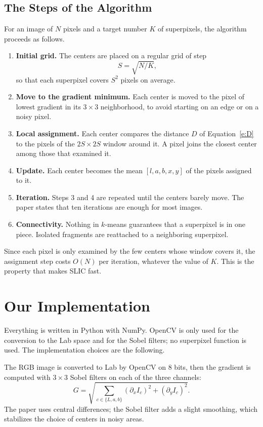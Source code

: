 \subsection{The Steps of the Algorithm}
For an image of $N$ pixels and a target number $K$ of
superpixels, the algorithm proceeds as follows.
\begin{enumerate}
\item \textbf{Initial grid.} The centers are placed on a regular grid of step
\begin{equation}
S = \sqrt{N/K},
\end{equation}
so that each superpixel covers $S^2$ pixels on average.
\item \textbf{Move to the gradient minimum.} Each
center is moved to the pixel of lowest gradient
in its $3 \times 3$ neighborhood, to avoid starting on
an edge or on a noisy pixel.
\item \textbf{Local assignment.} Each center compares the distance $D$ of
Equation~\eqref{e:D} to the pixels of the $2S \times 2S$ window around it. A pixel joins the closest center
among those that examined it.
\item \textbf{Update.} Each center becomes the mean
$[l, a, b, x, y]$ of the pixels assigned to it.
\item \textbf{Iteration.} Steps 3 and 4 are repeated until
the centers barely move. The paper
states that ten iterations are enough for most images.
\item \textbf{Connectivity.} Nothing in $k$-means guarantees
that a superpixel is in one piece. Isolated fragments are reattached to a neighboring superpixel.
\end{enumerate}
Since each pixel is only examined by the few
centers whose window covers it, the assignment step
costs $O(N)$ per iteration, whatever the value of $K$. This is the property
that makes SLIC fast.

\section{Our Implementation}\label{s:impl}
Everything is written in Python with NumPy. OpenCV
is only used for the conversion to the Lab space and for the Sobel
filters; no superpixel function is used.
The implementation choices are the following.

 The RGB image is converted to
Lab by OpenCV on 8 bits, then the gradient is computed
with $3 \times 3$ Sobel filters on each of the three channels:
\begin{equation}\label{e:G}
G = \sqrt{\sum_{c \in \{L,a,b\}} (\partial_x I_c)^2 + (\partial_y I_c)^2}.
\end{equation}
The paper uses central differences; the Sobel filter
adds a slight smoothing, which stabilizes the choice of centers in noisy areas.

